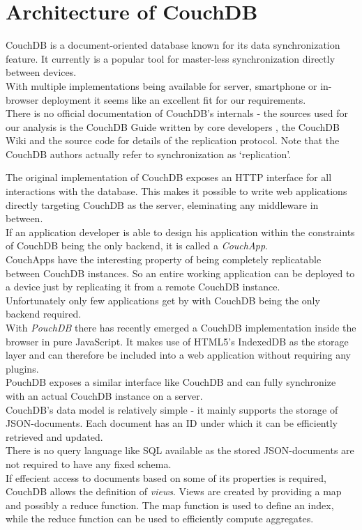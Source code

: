 \section{Architecture of CouchDB}
\label{sec:main.couchdb}
CouchDB is a document-oriented database known for its data synchronization feature.
It currently is a popular tool for master-less synchronization directly between devices.\\
With multiple implementations being available for server, smartphone or in-browser deployment it seems like an excellent fit for our requirements.\\
There is no official documentation of CouchDB's internals - the sources used for our analysis is the CouchDB Guide written by core developers \cite{anderson2010couchdb}, the CouchDB Wiki \cite{couchdb_wiki} and the source code \cite{couchdb_source} for details of the replication protocol.
Note that the CouchDB authors actually refer to synchronization as `replication'.

The original implementation of CouchDB exposes an HTTP interface for all interactions with the database.
This makes it possible to write web applications directly targeting CouchDB as the server, eleminating any middleware in between.\\
If an application developer is able to design his application within the constraints of CouchDB being the only backend, it is called a \emph{CouchApp}.\\
CouchApps have the interesting property of being completely replicatable between CouchDB instances.
So an entire working application can be deployed to a device just by replicating it from a remote CouchDB instance.\\
Unfortunately only few applications get by with CouchDB being the only backend required.\\

With \emph{PouchDB} there has recently emerged a CouchDB implementation inside the browser in pure JavaScript.
It makes use of HTML5's IndexedDB as the storage layer and can therefore be included into a web application without requiring any plugins.\\
PouchDB exposes a similar interface like CouchDB and can fully synchronize with an actual CouchDB instance on a server.\\

CouchDB's data model is relatively simple - it mainly supports the storage of JSON-documents.
Each document has an ID under which it can be efficiently retrieved and updated.\\
There is no query language like SQL available as the stored JSON-documents are not required to have any fixed schema.\\
If effecient access to documents based on some of its properties is required, CouchDB allows the definition of \emph{views}.
Views are created by providing a map and possibly a reduce function.
The map function is used to define an index, while the reduce function can be used to efficiently compute aggregates.\\

